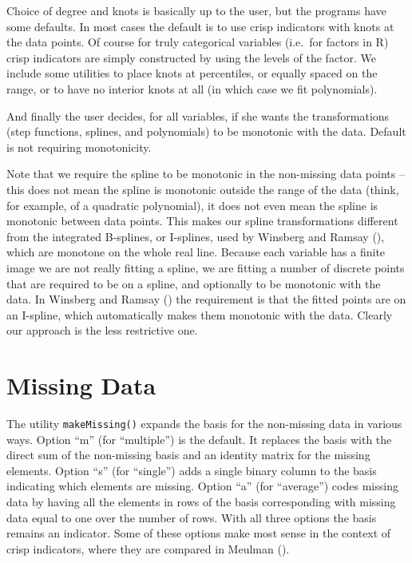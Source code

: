 \documentclass[
  12pt,
  letterpaper,
]{scrbook}
\begin{document}
Choice of degree and knots is basically up to the user, but the programs
have some defaults. In most cases the default is to use crisp indicators
with knots at the data points. Of course for truly categorical variables
(i.e.~for factors in R) crisp indicators are simply constructed by using
the levels of the factor. We include some utilities to place knots at
percentiles, or equally spaced on the range, or to have no interior
knots at all (in which case we fit polynomials).

And finally the user decides, for all variables, if she wants the
transformations (step functions, splines, and polynomials) to be
monotonic with the data. Default is not requiring monotonicity.

Note that we require the spline to be monotonic in the non-missing data
points -- this does not mean the spline is monotonic outside the range
of the data (think, for example, of a quadratic polynomial), it does not
even mean the spline is monotonic between data points. This makes our
spline transformations different from the integrated B-splines, or
I-splines, used by Winsberg and Ramsay
(), which are monotone on the
whole real line. Because each variable has a finite image we are not
really fitting a spline, we are fitting a number of discrete points that
are required to be on a spline, and optionally to be monotonic with the
data. In Winsberg and Ramsay ()
the requirement is that the fitted points are on an I-spline, which
automatically makes them monotonic with the data. Clearly our approach
is the less restrictive one.

\section{Missing Data}\label{missing-data}

The utility \texttt{makeMissing()} expands the basis for the non-missing
data in various ways. Option ``m'' (for ``multiple'') is the default. It
replaces the basis with the direct sum of the non-missing basis and an
identity matrix for the missing elements. Option ``s'' (for ``single'')
adds a single binary column to the basis indicating which elements are
missing. Option ``a'' (for ``average'') codes missing data by having all
the elements in rows of the basis corresponding with missing data equal
to one over the number of rows. With all three options the basis remains
an indicator. Some of these options make most sense in the context of
crisp indicators, where they are compared in Meulman
().
\end{document}
